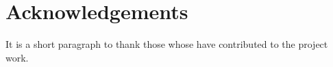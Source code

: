 \chapter*{Acknowledgements} 
\normalsize 
\vspace{5mm}

It is a short paragraph to thank those whose have contributed to the project work.
